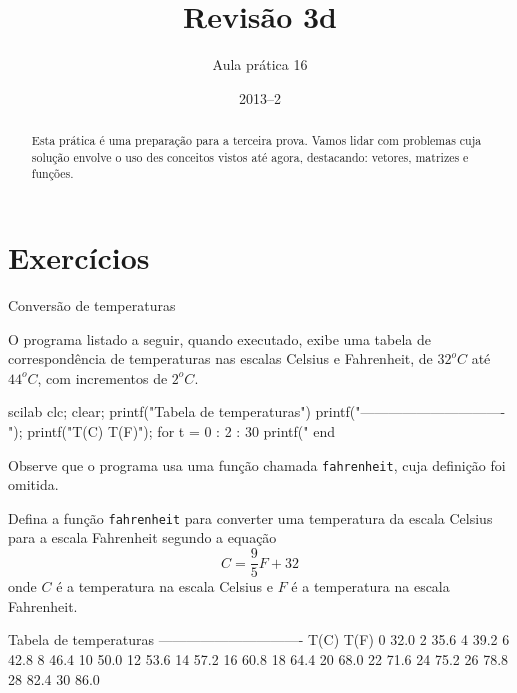 \documentclass[11pt]{practice}
\begin{document}
\subtitle{Aula prática 16}
\title{Revisão 3d}
\author{}
\date{2013--2}
\maketitle

\begin{abstract}
  Esta prática é uma preparação para a terceira prova. Vamos lidar com
  problemas cuja solução envolve o uso des conceitos vistos até agora,
  destacando: vetores, matrizes e funções.
\end{abstract}


\section{Exercícios}

\begin{task}[breakable]{Conversão de temperaturas}{}

  O programa listado a seguir, quando executado, exibe uma tabela de
  correspondência de temperaturas nas escalas Celsius e Fahrenheit, de
  $32^oC$ até $44^oC$, com incrementos de $2^oC$.

  \begin{lst}{scilab}
clc; clear;
printf("Tabela de temperaturas\n")
printf("-------------------------------\n");
printf("T(C)    T(F)\n");
for t = 0 : 2 : 30
    printf("%
end
  \end{lst}

  Observe que o programa usa uma função chamada \texttt{fahrenheit},
  cuja definição foi omitida.

  Defina a função \texttt{fahrenheit} para converter uma temperatura da
  escala Celsius para a escala Fahrenheit segundo a equação
  \[ C = \frac{9}{5} F + 32 \] onde $C$ é a temperatura na escala
  Celsius e $F$ é a temperatura na escala Fahrenheit.

  \begin{runexample}
Tabela de temperaturas
-------------------------------
T(C)    T(F)
   0    32.0
   2    35.6
   4    39.2
   6    42.8
   8    46.4
  10    50.0
  12    53.6
  14    57.2
  16    60.8
  18    64.4
  20    68.0
  22    71.6
  24    75.2
  26    78.8
  28    82.4
  30    86.0
  \end{runexample}

  \tcblower
  \solution
\end{task}
\end{document}
